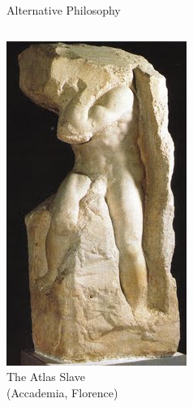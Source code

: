\documentclass[t,xcolor=dvipsnames]{beamer}
\begin{document}
\begin{frame}{Alternative Philosophy}
\begin{columns}[onlytextwidth,T]
\begin{column}{0.34\textwidth}
\includegraphics[width=\textwidth]{statue}\\
\tiny \flushright 
The Atlas Slave\\(Accademia, Florence)
\end{column}
\end{columns}
\end{frame}
\end{document}
